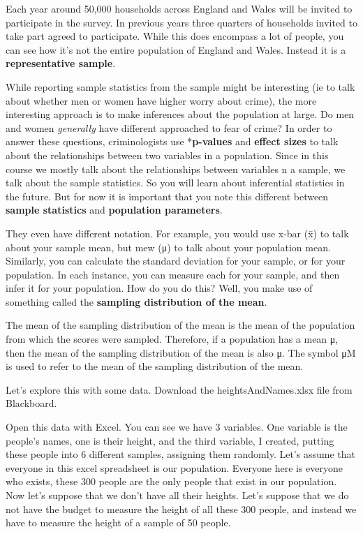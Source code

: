 \documentclass[]{book}
\theoremstyle{definition}
\theoremstyle{definition}
\theoremstyle{definition}
\theoremstyle{remark}
\begin{document}
Each year around 50,000 households across England and Wales will be
invited to participate in the survey. In previous years three quarters
of households invited to take part agreed to participate. While this
does encompass a lot of people, you can see how it's not the entire
population of England and Wales. Instead it is a \textbf{representative
sample}.

While reporting sample statistics from the sample might be interesting
(ie to talk about whether men or women have higher worry about crime),
the more interesting approach is to make inferences about the population
at large. Do men and women \emph{generally} have different approached to
fear of crime? In order to answer these questions, criminologists use
*\textbf{p-values} and \textbf{effect sizes} to talk about the
relationships between two variables in a population. Since in this
course we mostly talk about the relationships between variables n a
sample, we talk about the sample statistics. So you will learn about
inferential statistics in the future. But for now it is important that
you note this different between \textbf{sample statistics} and
\textbf{population parameters}.

They even have different notation. For example, you would use x-bar (x̄)
to talk about your sample mean, but mew (μ) to talk about your
population mean. Similarly, you can calculate the standard deviation for
your sample, or for your population. In each instance, you can measure
each for your sample, and then infer it for your population. How do you
do this? Well, you make use of something called the \textbf{sampling
distribution of the mean}.

The mean of the sampling distribution of the mean is the mean of the
population from which the scores were sampled. Therefore, if a
population has a mean μ, then the mean of the sampling distribution of
the mean is also μ. The symbol μM is used to refer to the mean of the
sampling distribution of the mean.

Let's explore this with some data. Download the heightsAndNames.xlsx
file from Blackboard.

Open this data with Excel. You can see we have 3 variables. One variable
is the people's names, one is their height, and the third variable, I
created, putting these people into 6 different samples, assigning them
randomly. Let's assume that everyone in this excel spreadsheet is our
population. Everyone here is everyone who exists, these 300 people are
the only people that exist in our population. Now let's suppose that we
don't have all their heights. Let's suppose that we do not have the
budget to measure the height of all these 300 people, and instead we
have to measure the height of a sample of 50 people.
\end{document}
